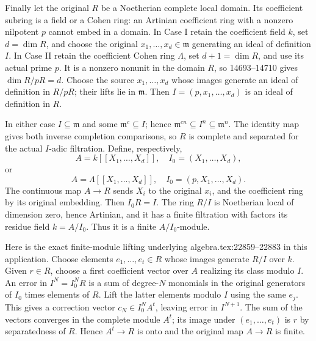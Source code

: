 Finally let the original \(R\) be a Noetherian complete local domain. Its coefficient subring is a field or a Cohen ring: an Artinian coefficient ring with a nonzero nilpotent \(p\) cannot embed in a domain. In Case I retain the coefficient field \(k\), set \(d=\dim R\), and choose the original \(x_1,\ldots,x_d\in\mathfrak m\) generating an ideal of definition \(I\). In Case II retain the coefficient Cohen ring \(\Lambda\), set \(d+1=\dim R\), and use its actual prime \(p\). It is a nonzero nonunit in the domain \(R\), so 14693--14710 gives \(\dim R/pR=d\). Choose the source \(x_1,\ldots,x_d\) whose images generate an ideal of definition in \(R/pR\); their lifts lie in \(\mathfrak m\). Then \(I=(p,x_1,\ldots,x_d)\) is an ideal of definition in \(R\).

In either case \(I\subseteq\mathfrak m\) and some \(\mathfrak m^c\subseteq I\); hence \(\mathfrak m^{cn}\subseteq I^n\subseteq\mathfrak m^n\). The identity map gives both inverse completion comparisons, so \(R\) is complete and separated for the actual \(I\)-adic filtration. Define, respectively, \[
 A=k[[X_1,\ldots,X_d]],\quad I_0=(X_1,\ldots,X_d),
\] or \[
 A=\Lambda[[X_1,\ldots,X_d]],\quad I_0=(p,X_1,\ldots,X_d).
\] The continuous map \(A\to R\) sends \(X_i\) to the original \(x_i\), and the coefficient ring by its original embedding. Then \(I_0R=I\). The ring \(R/I\) is Noetherian local of dimension zero, hence Artinian, and it has a finite filtration with factors its residue field \(k=A/I_0\). Thus it is a finite \(A/I_0\)-module.

Here is the exact finite-module lifting underlying algebra.tex:22859--22883 in this application. Choose elements \(e_1,\ldots,e_t\in R\) whose images generate \(R/I\) over \(k\). Given \(r\in R\), choose a first coefficient vector over \(A\) realizing its class modulo \(I\). An error in \(I^N=I_0^NR\) is a sum of degree-\(N\) monomials in the original generators of \(I_0\) times elements of \(R\). Lift the latter elements modulo \(I\) using the same \(e_j\). This gives a correction vector \(c_N\in I_0^N A^t\), leaving error in \(I^{N+1}\). The sum of the vectors converges in the complete module \(A^t\); its image under \((e_1,\ldots,e_t)\) is \(r\) by separatedness of \(R\). Hence \(A^t\to R\) is onto and the original map \(A\to R\) is finite.

